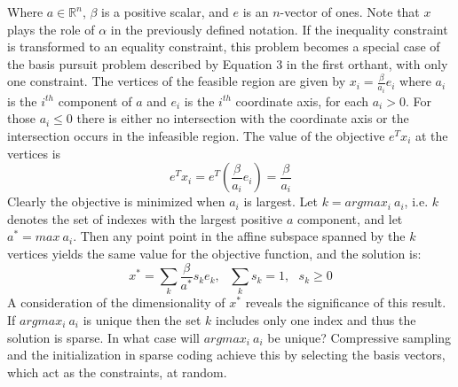 \documentclass[12pt,a4paper]{article}
\begin{document}
Where $a \in \mathbb{R}^n$, $\beta$ is a positive scalar, and $e$ is an $n$-vector of ones. Note that $x$ plays the role of $\alpha$ in the previously defined notation. If the inequality constraint is transformed to an equality constraint, this problem becomes a special case of the basis pursuit problem described by Equation 3 in the first orthant, with only one constraint. The vertices of the feasible region are given by $x_i = \frac{\beta}{a_i} e_i$ where $a_i$ is the $i^{th}$ component of $a$ and $e_i$ is the $i^{th}$ coordinate axis, for each $a_i >0$. For those $a_i \leq 0$ there is either no intersection with the coordinate axis or the intersection occurs in the infeasible region. The value of the objective $e^Tx_i$ at the vertices is 
\begin{equation} 
\nonumber 
e^T x_i = e^T \left( \frac{\beta}{a_i} e_i \right) = \frac{\beta}{a_i}
\end{equation} 
Clearly the objective is minimized when $a_i$ is largest. Let $k = argmax_i~a_i$, i.e. $k$ denotes the set of indexes with the largest positive $a$ component, and let $a^* = max~a_i$. Then any point point in the affine subspace spanned by the $k$ vertices yields the same value for the objective function, and the solution is: 
\begin{equation} 
\nonumber
x^* = \sum_k \frac{\beta}{a^*} s_k e_k, ~~~ \sum_k s_k =1, ~~~ s_k \geq 0
\end{equation}    
A consideration of the dimensionality of $x^*$ reveals the significance of this result. If $argmax_i~a_i$ is unique then the set $k$ includes only one index and thus the solution is sparse. In what case will $argmax_i~a_i$ be unique? Compressive sampling and the initialization in sparse coding achieve this by selecting the basis vectors, which act as the constraints, at random.
\end{document}
